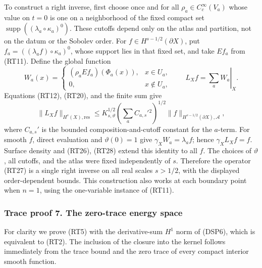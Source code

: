 \documentclass[
  11pt,
]{article}
\makeatletter
\let\ReaderOriginalAnchorStart\hyper@anchorstart
\let\ReaderOriginalAnchorEnd\hyper@anchorend
\let\ReaderPendingAliases\@empty
\def\ReaderArmAliases#1{\gdef\ReaderPendingAliases{#1}}
\def\hyper@anchorstart#1{\ReaderIfNativeAnchorTF{#1}{\ReaderPendingAliases\global\let\ReaderPendingAliases\@empty}{}\ReaderOriginalAnchorStart{#1}}
\makeatother
\begin{document}
To construct a right inverse, first choose once and for all
\(\rho_a\in C_c^\infty(V_a)\) whose value on \(t=0\) is one on a
neighborhood of the fixed compact set
\(\operatorname{supp}((\lambda_a\circ\kappa_a)^0)\). These cutoffs
depend only on the atlas and partition, not on the datum or the Sobolev
order. For \(f\in H^{s-1/2}(\partial X)\), put
\(f_a=((\lambda_af)\circ\kappa_a)^0\), whose support lies in that fixed
set, and take \(Ef_a\) from (RT11). Define the global function \[
 W_a(x)=
 \begin{cases}
  (\rho_aEf_a)(\Phi_a(x)),&x\in U_a,\\
  0,&x\notin U_a,
 \end{cases}
 \qquad
 L_Xf=\left.\sum_aW_a\right|_X.
 \tag{RT27}
\] Equations (RT12), (RT20), and the finite sum give \[
 \|L_Xf\|_{H^s(X),\mathrm{res}}
 \leq K_{s,\vartheta}^{1/2}
       \left(\sum_a C_{a,s}'{}^2\right)^{1/2}
       \|f\|_{H^{s-1/2}(\partial X),\mathcal A},
 \tag{RT28}
\] where \(C_{a,s}'\) is the bounded composition-and-cutoff constant for
the \(a\)-term. For smooth \(f\), direct evaluation and
\(\vartheta(0)=1\) give \(\gamma_XW_a=\lambda_af\); hence
\(\gamma_XL_Xf=f\). Surface density and (RT26), (RT28) extend this
identity to all \(f\). The choices of \(\vartheta\), all cutoffs, and
the atlas were fixed independently of \(s\). Therefore the operator
(RT27) is a single right inverse on all real scales \(s>1/2\), with the
displayed order-dependent bounds. This construction also works at each
boundary point when \(n=1\), using the one-variable instance of (RT11).

\ReaderArmAliases{\ReaderOriginalAnchorStart{trace-proof-7-the-zero-trace-energy-space}\ReaderOriginalAnchorEnd\begingroup\expandafter\def\csname @currentHref\endcsname{trace-proof-7-the-zero-trace-energy-space}\label{trace-proof-7-the-zero-trace-energy-space}\endgroup\ReaderOriginalAnchorStart{trace-proof-7.-the-zero-trace-energy-space}\ReaderOriginalAnchorEnd}
\subsubsection{Trace proof 7. The zero-trace energy
space}\label{trace-proof-7.-the-zero-trace-energy-space}

For clarity we prove (RT5) with the derivative-sum \(H^1\) norm of
(DSP6), which is equivalent to (RT2). The inclusion of the closure into
the kernel follows immediately from the trace bound and the zero trace
of every compact interior smooth function.
\end{document}

